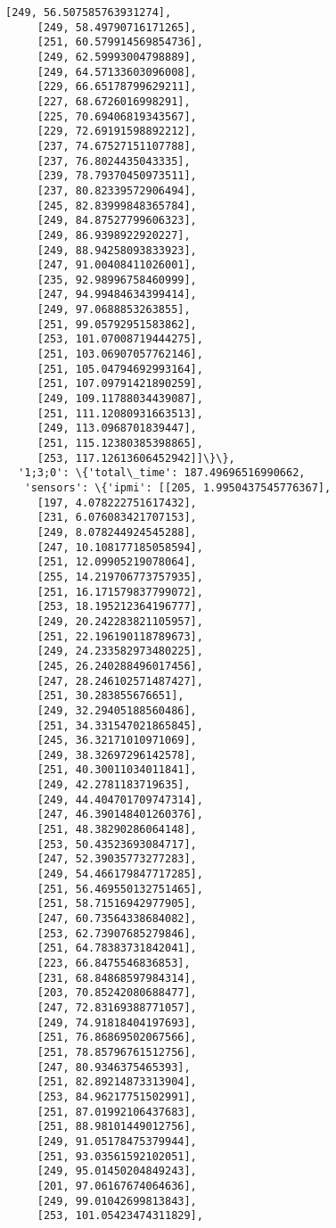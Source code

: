 \documentclass[11pt]{article}
\begin{document}
\begin{tcolorbox}[breakable, size=fbox, boxrule=.5pt, pad at break*=1mm, opacityfill=0]
\begin{Verbatim}[commandchars=\\\{\}]
     [249, 56.507585763931274],
     [249, 58.49790716171265],
     [251, 60.579914569854736],
     [249, 62.59993004798889],
     [249, 64.57133603096008],
     [229, 66.65178799629211],
     [227, 68.6726016998291],
     [225, 70.69406819343567],
     [229, 72.69191598892212],
     [237, 74.67527151107788],
     [237, 76.8024435043335],
     [239, 78.79370450973511],
     [237, 80.82339572906494],
     [245, 82.83999848365784],
     [249, 84.87527799606323],
     [249, 86.9398922920227],
     [249, 88.94258093833923],
     [247, 91.00408411026001],
     [235, 92.98996758460999],
     [247, 94.99484634399414],
     [249, 97.0688853263855],
     [251, 99.05792951583862],
     [253, 101.07008719444275],
     [251, 103.06907057762146],
     [251, 105.04794692993164],
     [251, 107.09791421890259],
     [249, 109.11788034439087],
     [251, 111.12080931663513],
     [249, 113.0968701839447],
     [251, 115.12380385398865],
     [253, 117.12613606452942]]\}\},
  '1;3;0': \{'total\_time': 187.49696516990662,
   'sensors': \{'ipmi': [[205, 1.9950437545776367],
     [197, 4.078222751617432],
     [231, 6.076083421707153],
     [249, 8.078244924545288],
     [247, 10.108177185058594],
     [251, 12.09905219078064],
     [255, 14.219706773757935],
     [251, 16.171579837799072],
     [253, 18.195212364196777],
     [249, 20.242283821105957],
     [251, 22.196190118789673],
     [249, 24.233582973480225],
     [245, 26.240288496017456],
     [247, 28.246102571487427],
     [251, 30.283855676651],
     [249, 32.29405188560486],
     [251, 34.331547021865845],
     [245, 36.32171010971069],
     [249, 38.32697296142578],
     [251, 40.30011034011841],
     [249, 42.2781183719635],
     [249, 44.404701709747314],
     [247, 46.390148401260376],
     [251, 48.38290286064148],
     [253, 50.43523693084717],
     [247, 52.39035773277283],
     [249, 54.466179847717285],
     [251, 56.469550132751465],
     [251, 58.71516942977905],
     [247, 60.73564338684082],
     [253, 62.73907685279846],
     [251, 64.78383731842041],
     [223, 66.8475546836853],
     [231, 68.84868597984314],
     [203, 70.85242080688477],
     [247, 72.83169388771057],
     [249, 74.91818404197693],
     [251, 76.86869502067566],
     [251, 78.85796761512756],
     [247, 80.9346375465393],
     [251, 82.89214873313904],
     [253, 84.96217751502991],
     [251, 87.01992106437683],
     [251, 88.98101449012756],
     [249, 91.05178475379944],
     [251, 93.03561592102051],
     [249, 95.01450204849243],
     [201, 97.06167674064636],
     [249, 99.01042699813843],
     [253, 101.05423474311829],

\end{Verbatim}
\end{tcolorbox}
\end{document}
